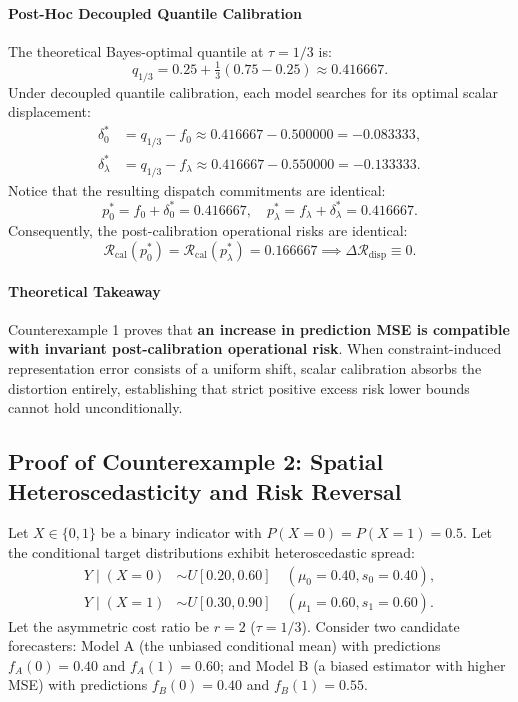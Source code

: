 \paragraph{Post-Hoc Decoupled Quantile Calibration}
The theoretical Bayes-optimal quantile at $\tau = 1/3$ is:
\begin{equation}
q_{1/3} = 0.25 + \tfrac{1}{3}(0.75 - 0.25) \approx 0.416667.
\end{equation}
Under decoupled quantile calibration, each model searches for its optimal scalar displacement:
\begin{align}
\delta_0^* &= q_{1/3} - f_0 \approx 0.416667 - 0.500000 = -0.083333, \\
\delta_\lambda^* &= q_{1/3} - f_\lambda \approx 0.416667 - 0.550000 = -0.133333.
\end{align}
Notice that the resulting dispatch commitments are identical:
\begin{equation}
p_0^* = f_0 + \delta_0^* = 0.416667, \quad p_\lambda^* = f_\lambda + \delta_\lambda^* = 0.416667.
\end{equation}
Consequently, the post-calibration operational risks are identical:
\begin{equation}
\mathcal{R}_{\text{cal}}(p_0^*) = \mathcal{R}_{\text{cal}}(p_\lambda^*) = 0.166667 \implies \Delta \mathcal{R}_{\text{disp}} \equiv 0.
\end{equation}

\paragraph{Theoretical Takeaway}
Counterexample 1 proves that \textbf{an increase in prediction MSE is compatible with invariant post-calibration operational risk}. When constraint-induced representation error consists of a uniform shift, scalar calibration absorbs the distortion entirely, establishing that strict positive excess risk lower bounds cannot hold unconditionally.

\subsection{Proof of Counterexample 2: Spatial Heteroscedasticity and Risk Reversal}
\label{subsec:counterexample2}

\begin{example}
\label{ex:heteroscedasticity}
Let $X \in \{0, 1\}$ be a binary indicator with $P(X=0) = P(X=1) = 0.5$. Let the conditional target distributions exhibit heteroscedastic spread:
\begin{align}
Y \mid (X=0) &\sim U[0.20, 0.60] \quad (\mu_0 = 0.40, s_0 = 0.40), \\
Y \mid (X=1) &\sim U[0.30, 0.90] \quad (\mu_1 = 0.60, s_1 = 0.60).
\end{align}
Let the asymmetric cost ratio be $r = 2$ ($\tau = 1/3$). Consider two candidate forecasters: Model A (the unbiased conditional mean) with predictions $f_A(0) = 0.40$ and $f_A(1) = 0.60$; and Model B (a biased estimator with higher MSE) with predictions $f_B(0) = 0.40$ and $f_B(1) = 0.55$.
\end{example}

